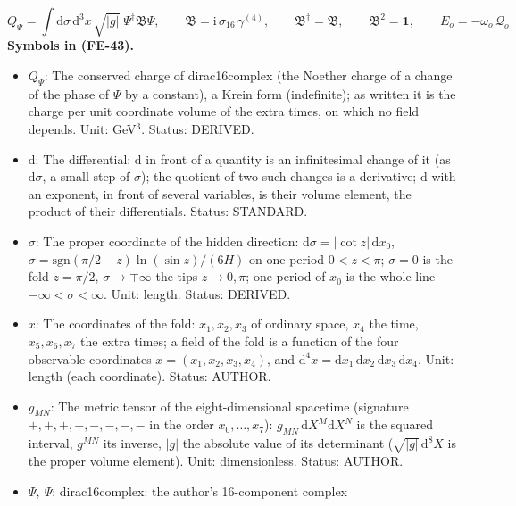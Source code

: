 \documentclass[
  10pt,
]{article}
\providecommand{\tightlist}{%
  \setlength{\itemsep}{0pt}\setlength{\parskip}{0pt}}
\begin{document}
\[
Q_\Psi = \int\mathrm{d}\sigma\,\mathrm{d}^3x\,\sqrt{\lvert g\rvert}\;\Psi^\dagger\mathfrak{B}\Psi,\qquad
\mathfrak{B} = \mathrm{i}\,\sigma_{16}\,\gamma^{(4)},\qquad \mathfrak{B}^\dagger = \mathfrak{B},\qquad \mathfrak{B}^2 = \mathbf{1},\qquad
E_o = -\omega_o\,\mathcal{Q}_o \tag{FE-43}
\] \textbf{Symbols in (FE-43).}

\begin{itemize}
\tightlist
\item
  \(Q_\Psi\): The conserved charge of dirac16complex (the Noether charge
  of a change of the phase of \(\Psi\) by a constant), a Krein form
  (indefinite); as written it is the charge per unit coordinate volume
  of the extra times, on which no field depends. Unit: GeV\(^3\).
  Status: DERIVED.
\item
  \(\mathrm{d}\): The differential: \(\mathrm{d}\) in front of a
  quantity is an infinitesimal change of it (as \(\mathrm{d}\sigma\), a
  small step of \(\sigma\)); the quotient of two such changes is a
  derivative; \(\mathrm{d}\) with an exponent, in front of several
  variables, is their volume element, the product of their
  differentials. Status: STANDARD.
\item
  \(\sigma\): The proper coordinate of the hidden direction:
  \(\mathrm{d}\sigma = \lvert\cot z\rvert\,\mathrm{d}x_0\),
  \(\sigma = \mathrm{sgn}(\pi/2 - z)\ln(\sin z)/(6H)\) on one period
  \(0 < z < \pi\); \(\sigma = 0\) is the fold \(z = \pi/2\),
  \(\sigma \to \mp\infty\) the tips \(z \to 0, \pi\); one period of
  \(x_0\) is the whole line \(-\infty < \sigma < \infty\). Unit: length.
  Status: DERIVED.
\item
  \(x\): The coordinates of the fold: \(x_1, x_2, x_3\) of ordinary
  space, \(x_4\) the time, \(x_5, x_6, x_7\) the extra times; a field of
  the fold is a function of the four observable coordinates
  \(x = (x_1, x_2, x_3, x_4)\), and
  \(\mathrm{d}^4x = \mathrm{d}x_1\,\mathrm{d}x_2\,\mathrm{d}x_3\,\mathrm{d}x_4\).
  Unit: length (each coordinate). Status: AUTHOR.
\item
  \(g_{MN}\): The metric tensor of the eight-dimensional spacetime
  (signature \(+,+,+,+,-,-,-,-\) in the order \(x_0, \dots, x_7\)):
  \(g_{MN}\,\mathrm{d}X^M\mathrm{d}X^N\) is the squared interval,
  \(g^{MN}\) its inverse, \(\lvert g\rvert\) the absolute value of its
  determinant (\(\sqrt{\lvert g\rvert}\,\mathrm{d}^8X\) is the proper
  volume element). Unit: dimensionless. Status: AUTHOR.
\item
  \(\Psi,\ \bar\Psi\): dirac16complex: the author's 16-component complex

\end{itemize}
\end{document}
